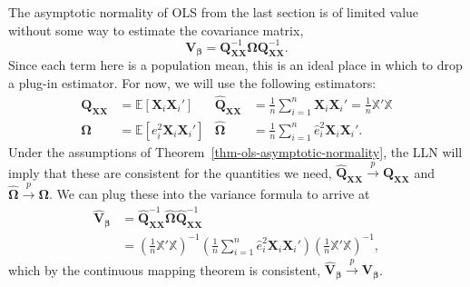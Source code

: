 \documentclass[
  letterpaper,
  DIV=11,
  numbers=noendperiod]{scrreprt}
\newcommand{\mb}{\symbf}
\newcommand{\E}{\mathbb{E}}
\newcommand{\X}{\mb{X}}
\newcommand{\Xmat}{\mathbb{X}}
\newcommand{\bfbeta}{\mb{\beta}}
\newcommand{\inprob}{\overset{p}{\to}}
\theoremstyle{plain}
\theoremstyle{definition}
\theoremstyle{definition}
\theoremstyle{remark}
\begin{document}
The asymptotic normality of OLS from the last section is of limited
value without some way to estimate the covariance matrix, \[ 
\mb{V}_{\bfbeta} = \mb{Q}_{\X\X}^{-1}\mb{\Omega}\mb{Q}_{\X\X}^{-1}.
\] Since each term here is a population mean, this is an ideal place in
which to drop a plug-in estimator. For now, we will use the following
estimators: \[ 
\begin{aligned}
  \mb{Q}_{\X\X} &= \E[\X_{i}\X_{i}'] & \widehat{\mb{Q}}_{\X\X} &= \frac{1}{n} \sum_{i=1}^{n} \X_{i}\X_{i}' = \frac{1}{n}\Xmat'\Xmat \\
  \mb{\Omega} &= \E[e_i^2\X_i\X_i'] & \widehat{\mb{\Omega}} & = \frac{1}{n}\sum_{i=1}^n\widehat{e}_i^2\X_i\X_i'.
\end{aligned}
\] Under the assumptions of Theorem~\ref{thm-ols-asymptotic-normality},
the LLN will imply that these are consistent for the quantities we need,
\(\widehat{\mb{Q}}_{\X\X} \inprob \mb{Q}_{\X\X}\) and
\(\widehat{\mb{\Omega}} \inprob \mb{\Omega}\). We can plug these into
the variance formula to arrive at \[ 
\begin{aligned}
  \widehat{\mb{V}}_{\bfbeta} &= \widehat{\mb{Q}}_{\X\X}^{-1}\widehat{\mb{\Omega}}\widehat{\mb{Q}}_{\X\X}^{-1} \\
  &= \left( \frac{1}{n} \Xmat'\Xmat \right)^{-1} \left( \frac{1}{n} \sum_{i=1}^n\widehat{e}_i^2\X_i\X_i' \right) \left( \frac{1}{n} \Xmat'\Xmat \right)^{-1},
\end{aligned}
\] which by the continuous mapping theorem is consistent,
\(\widehat{\mb{V}}_{\bfbeta} \inprob \mb{V}_{\bfbeta}\).
\end{document}
